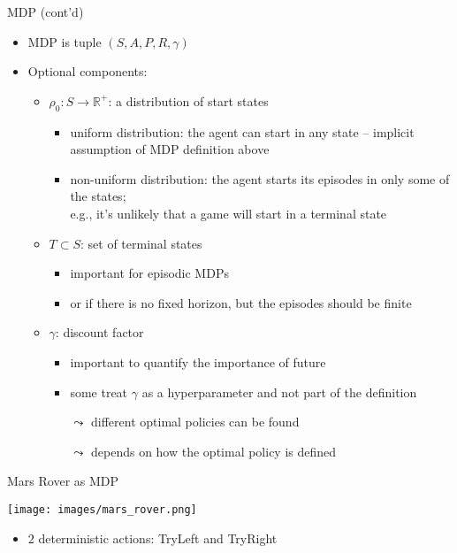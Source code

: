\documentclass[aspectratio=169]{../latex_main/tntbeamer}  %
\begin{document}
\begin{frame}[c]{MDP (cont'd)}
	
	\begin{itemize}
		\item MDP is tuple $(S,A,P, R, \gamma)$
		\item Optional components:
		\begin{itemize}
			\item $\rho_0: S \to \mathbb{R}^+$: a distribution of start states
			\begin{itemize}
				\item uniform distribution: the agent can start in any state -- implicit assumption of MDP definition above
				\item non-uniform distribution: the agent starts its episodes in only some of the states;\\ e.g., it's unlikely that a game will start in a terminal state
			\end{itemize}
		\pause
			\item $T \subset S$: set of terminal states
			\begin{itemize}
				\item important for episodic MDPs 
				\item or if there is no fixed horizon, but the episodes should be finite
			\end{itemize}
		\pause
			\item $\gamma$: discount factor
			\begin{itemize}
				\item important to quantify the importance of future 
				\smallskip
				\item some treat $\gamma$ as a hyperparameter and not part of the definition
				\item[$\leadsto$] different optimal policies can be found
				\item[$\leadsto$] depends on how the optimal policy is defined
			\end{itemize}
		\end{itemize}
	\end{itemize}
	
\end{frame}
\begin{frame}[c]{Mars Rover as MDP}

\begin{center}
	\texttt{[image: images/mars\_rover.png]}
\end{center}

\begin{itemize}
	\item $2$ deterministic actions: TryLeft and TryRight
\end{itemize}



\end{frame}
\end{document}
